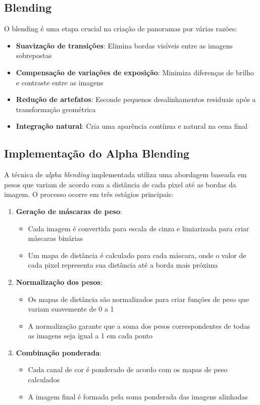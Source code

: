\documentclass[12pt]{article}
\begin{document}
\subsection{Blending}
O blending é uma etapa crucial na criação de panoramas por várias razões:
\begin{itemize}
    \item \textbf{Suavização de transições}: Elimina bordas visíveis entre as imagens sobrepostas
    \item \textbf{Compensação de variações de exposição}: Minimiza diferenças de brilho e contraste entre as imagens
    \item \textbf{Redução de artefatos}: Esconde pequenos desalinhamentos residuais após a transformação geométrica
    \item \textbf{Integração natural}: Cria uma aparência contínua e natural na cena final
\end{itemize}

\subsection{Implementação do Alpha Blending}
A técnica de \textit{alpha blending} implementada utiliza uma abordagem baseada em pesos que variam de acordo com a distância de cada pixel até as bordas da imagem. O processo ocorre em três estágios principais:

\begin{enumerate}
    \item \textbf{Geração de máscaras de peso}:
    \begin{itemize}
        \item Cada imagem é convertida para escala de cinza e limiarizada para criar máscaras binárias
        \item Um mapa de distância é calculado para cada máscara, onde o valor de cada pixel representa sua distância até a borda mais próxima
    \end{itemize}
    
    \item \textbf{Normalização dos pesos}:
    \begin{itemize}
        \item Os mapas de distância são normalizados para criar funções de peso que variam suavemente de 0 a 1
        \item A normalização garante que a soma dos pesos correspondentes de todas as imagens seja igual a 1 em cada ponto
    \end{itemize}
    
    \item \textbf{Combinação ponderada}:
    \begin{itemize}
        \item Cada canal de cor é ponderado de acordo com os mapas de peso calculados
        \item A imagem final é formada pela soma ponderada das imagens alinhadas
    \end{itemize}
\end{enumerate}
\end{document}
